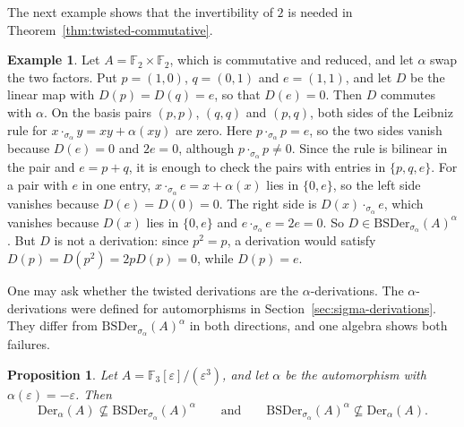 \documentclass[]{interact}
\theoremstyle{plain}
\newtheorem{proposition}[theorem]{Proposition}
\theoremstyle{definition}
\newtheorem{example}[theorem]{Example}
\theoremstyle{remark}
\newcommand{\BSDer}{\mathrm{BSDer}}
\newcommand{\ADer}{\mathrm{Der}_\alpha}
\begin{document}
The next example shows that the invertibility of $2$ is needed in Theorem~\ref{thm:twisted-commutative}.

\begin{example}\label{ex:twisted-char-two}
Let $A = \mathbb{F}_2 \times \mathbb{F}_2$, which is commutative and reduced, and let $\alpha$ swap the two factors.
Put $p = (1,0)$, $q = (0,1)$ and $e = (1,1)$, and let $D$ be the linear map with $D(p) = D(q) = e$, so that $D(e) = 0$.
Then $D$ commutes with $\alpha$.
On the basis pairs $(p,p)$, $(q,q)$ and $(p,q)$, both sides of the Leibniz rule for $x \cdot_{\sigma_\alpha} y = xy + \alpha(xy)$ are zero.
Here $p \cdot_{\sigma_\alpha} p = e$, so the two sides vanish because $D(e) = 0$ and $2e = 0$, although $p \cdot_{\sigma_\alpha} p \ne 0$.
Since the rule is bilinear in the pair and $e = p + q$, it is enough to check the pairs with entries in $\{p, q, e\}$. For a pair with $e$ in one entry, $x \cdot_{\sigma_\alpha} e = x + \alpha(x)$ lies in $\{0, e\}$, so the left side vanishes because $D(e) = D(0) = 0$. The right side is $D(x) \cdot_{\sigma_\alpha} e$, which vanishes because $D(x)$ lies in $\{0, e\}$ and $e \cdot_{\sigma_\alpha} e = 2e = 0$.
So $D \in \BSDer_{\sigma_\alpha}(A)^\alpha$.
But $D$ is not a derivation: since $p^2 = p$, a derivation would satisfy $D(p) = D(p^2) = 2pD(p) = 0$, while $D(p) = e$.
\end{example}

One may ask whether the twisted derivations are the $\alpha$-derivations. %
The $\alpha$-derivations were defined for automorphisms in Section~\ref{sec:sigma-derivations}.
They differ from $\BSDer_{\sigma_\alpha}(A)^\alpha$ in both directions, and one algebra shows both failures.

\begin{proposition}\label{prop:twisted}
Let $A = \mathbb{F}_3[\varepsilon]/(\varepsilon^3)$, and let $\alpha$ be the automorphism with $\alpha(\varepsilon) = -\varepsilon$.
Then
\[
\ADer(A) \not\subseteq \BSDer_{\sigma_\alpha}(A)^\alpha
\qquad\text{and}\qquad
\BSDer_{\sigma_\alpha}(A)^\alpha \not\subseteq \ADer(A).
\]
\end{proposition}
\end{document}

